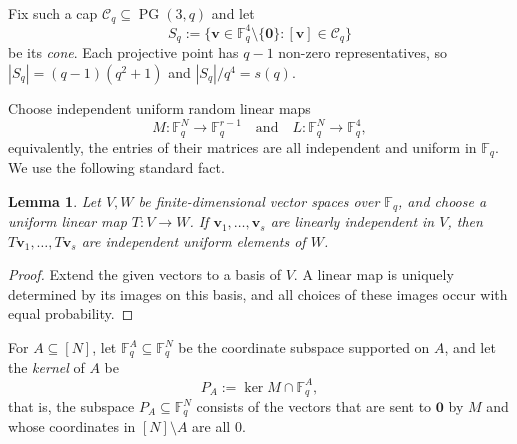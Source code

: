 \documentclass[10pt,a4paper]{article}
\numberwithin{equation}{section}
\newtheorem{lemma}[theorem]{Lemma}
\theoremstyle{definition}
\theoremstyle{remark}
\newcommand{\hide}[1]{{\color{DarkGreen}#1}}
\renewcommand{\hide}[1]{}
\newcommand{\V}[1]{\boldsymbol{#1}}
\renewcommand{\longrightarrow}{\to}
\begin{document}
\hide{
\begin{proof}
    Let $K:=\mathbb F_{q^2}$, identify $\mathbb F_q^4$ with $\mathbb F_q\times\mathbb F_q\times K$, and write $\operatorname{Nm}(z):=z^{q+1}$ for the norm from $K$ to $\mathbb F_q$. Put
    \[
    \mathcal C_q:=\{[(1,\operatorname{Nm}(z),z)]:z\in K\}\cup\{[(0,1,0)]\}.
    \]
    These are $q^2+1$ distinct points, all represented by zeros of the quadratic form $Q(a,b,z):=ab-\operatorname{Nm}(z)$. If $\V{u}=(1,\operatorname{Nm}(z),z)$ and $\V{v}=(1,\operatorname{Nm}(w),w)$, then expansion of the norm gives
    \[
    Q(s\V{u}+t\V{v})=st\operatorname{Nm}(z-w)
    \quad(s,t\in\mathbb F_q).
    \]
    For $z\ne w$, the norm on the right is non-zero, so the line through $[\V{u}]$ and $[\V{v}]$ contains no other zero of $Q$. If instead $\V{u}=(0,1,0)$ and $\V{v}=(1,\operatorname{Nm}(z),z)$, the corresponding identity is $Q(s\V{u}+t\V{v})=st$, with the same conclusion. Thus no three points of $\mathcal C_q$ are collinear.
\end{proof}
}

Fix such a cap  $\mathcal C_q\subseteq\operatorname{PG}(3,q)$ and let
\[
S_q:=\{\V{v}\in\mathbb F_q^4\setminus\{\V{0}\}:[\V{v}]\in\mathcal C_q\}
\]
be its \emph{cone}. Each projective point has $q-1$ non-zero representatives, so $|S_q|=(q-1)(q^2+1)$ and $|S_q|/q^4=s(q)$.

Choose independent uniform random linear maps
\[
M:\mathbb F_q^N\longrightarrow\mathbb F_q^{r-1}\quad\text{and}\quad
L:\mathbb F_q^N\longrightarrow\mathbb F_q^4,
\]
equivalently, the entries of their matrices are all independent and uniform in $\mathbb F_q$. We use the following standard fact.

\begin{lemma}\label{lem:uniform}
    Let $V,W$ be finite-dimensional vector spaces over $\mathbb F_q$, and choose a uniform linear map $T:V\to W$. If $\V{v}_1,\ldots,\V{v}_s$ are linearly independent in $V$, then $T\V{v}_1,\ldots,T\V{v}_s$ are independent uniform elements of $W$.
\end{lemma}

\begin{proof}
    Extend the given vectors to a basis of $V$. A linear map is uniquely determined by its images on this basis, and all choices of these images occur with equal probability.
\end{proof}

For $A\subseteq[N]$, let $\mathbb F_q^A\subseteq\mathbb F_q^N$ be the coordinate subspace supported on $A$, and let the \emph{kernel} of $A$ be
\[
P_A:=\ker M\cap\mathbb F_q^A,
\]
 that is, the subspace $P_A\subseteq \mathbb F_q^N$ consists of the vectors that are sent to $\V{0}$ by $M$  and whose coordinates in $[N]\setminus A$ are all $0$.
\end{document}
